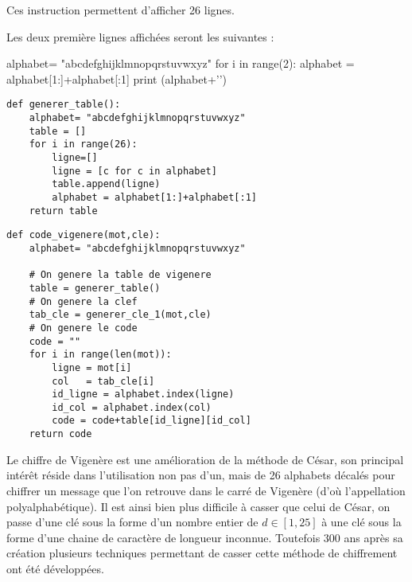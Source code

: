 \question{}

Ces instruction permettent d'afficher 26 lignes.

Les deux première lignes affichées seront les suivantes : 


\begin{pycode}
alphabet= "abcdefghijklmnopqrstuvwxyz"
for i in range(2):
    alphabet = alphabet[1:]+alphabet[:1]
    print (alphabet+'\n')
\end{pycode}


\question{}

\begin{center}
\begin{lstlisting}
def generer_table():
    alphabet= "abcdefghijklmnopqrstuvwxyz"
    table = []
    for i in range(26):
        ligne=[]
        ligne = [c for c in alphabet]
        table.append(ligne)
        alphabet = alphabet[1:]+alphabet[:1]
    return table
\end{lstlisting}
\end{center}

\question{}



\question{}
\begin{center}
\begin{lstlisting}
def code_vigenere(mot,cle):
    alphabet= "abcdefghijklmnopqrstuvwxyz"

    # On genere la table de vigenere
    table = generer_table()
    # On genere la clef
    tab_cle = generer_cle_1(mot,cle)
    # On genere le code
    code = ""
    for i in range(len(mot)):
        ligne = mot[i]
        col   = tab_cle[i]
        id_ligne = alphabet.index(ligne)
        id_col = alphabet.index(col)
        code = code+table[id_ligne][id_col]
    return code
\end{lstlisting}
\end{center}



\question{}

Le chiffre de Vigenère est une amélioration de la méthode de César, son principal intérêt réside dans l'utilisation non pas d'un, mais de 26 alphabets  décalés pour chiffrer un message que l'on retrouve dans le carré de Vigenère (d'où l'appellation polyalphabétique). Il est ainsi bien plus difficile à casser que celui de César, on passe d'une clé sous la forme d'un nombre entier de $d\in\left[1,25\right]$ à une clé sous la forme d'une chaine de caractère de longueur inconnue. Toutefois 300 ans après sa création plusieurs techniques permettant de casser cette méthode de chiffrement ont été développées.





